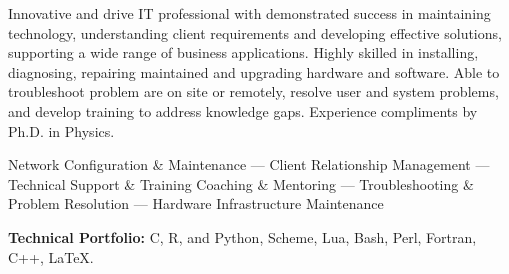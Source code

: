 

\begin{cvparagraph}
    Innovative and drive IT professional with demonstrated success in maintaining technology,
    understanding client requirements and developing effective solutions, 
    supporting a wide range of business applications.
    Highly skilled in installing, diagnosing, repairing maintained and upgrading hardware and software.
    Able to troubleshoot problem are on site or remotely,  
        resolve user and system problems, and develop training to address knowledge gaps.
        Experience compliments by Ph.D. in Physics.

\end{cvparagraph}


\begin{cvparagraph}
    Network Configuration \& Maintenance --- Client Relationship Management ---
    Technical Support \& Training Coaching \& Mentoring ---
    Troubleshooting \& Problem Resolution ---
    Hardware Infrastructure Maintenance
\end{cvparagraph}

    {\bfseries Technical Portfolio:} C, R, and Python, Scheme, Lua, Bash, Perl, Fortran, C++, \LaTeX{}.

